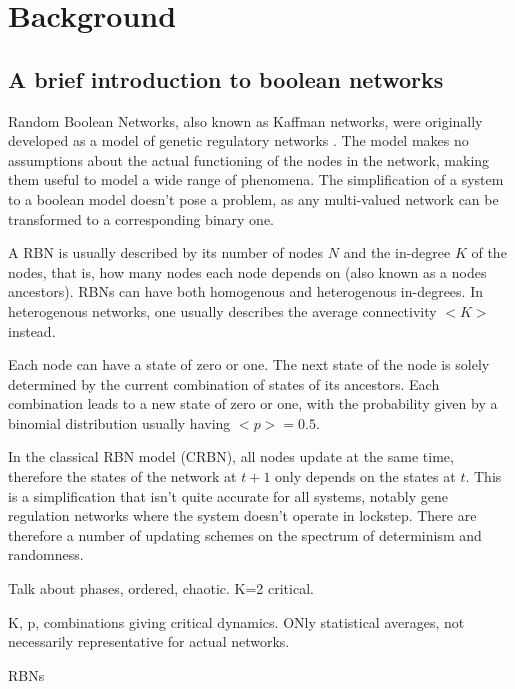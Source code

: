 \section{Background}

\subsection{A brief introduction to boolean networks}

Random Boolean Networks, also known as Kaffman networks, were originally developed as a model of genetic regulatory networks \cite{kauffman1969metabolic}.
The model makes no assumptions about the actual functioning of the nodes in the network,
making them useful to model a wide range of phenomena.
The simplification of a system to a boolean model doesn't pose a problem,
as any multi-valued network can be transformed to a corresponding binary one.

A RBN is usually described by its number of nodes $N$ and the in-degree $K$ of the nodes,
that is, how many nodes each node depends on (also known as a nodes ancestors).
RBNs can have both homogenous and heterogenous in-degrees.
In heterogenous networks, one usually describes the average connectivity $<K>$ instead.

Each node can have a state of zero or one.
The next state of the node is solely determined by the current combination of states of its ancestors.
Each combination leads to a new state of zero or one,
with the probability given by a binomial distribution usually having $<p>=0.5$.

In the classical RBN model (CRBN), all nodes update at the same time,
therefore the states of the network at $t+1$ only depends on the states at $t$.
This is a simplification that isn't quite accurate for all systems,
notably gene regulation networks where the system doesn't operate in lockstep.
There are therefore a number of updating schemes on the spectrum of determinism and randomness.

Talk about phases, ordered, chaotic. K=2 critical.

K, p, combinations giving critical dynamics. ONly statistical averages,
not necessarily representative for actual networks.

RBNs 

